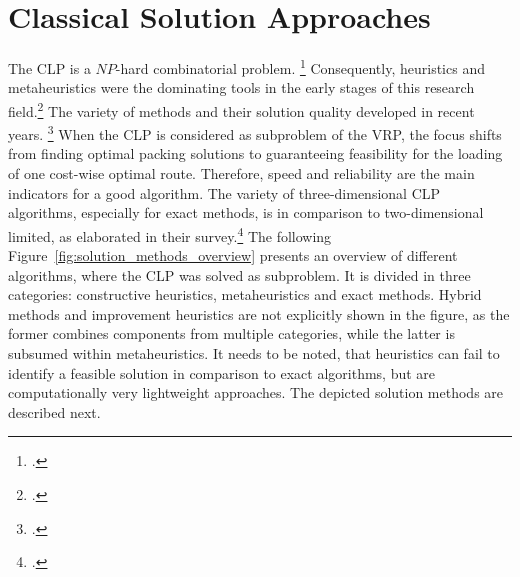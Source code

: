 \section{Classical Solution Approaches}
\label{sec:classical_solution_approaches}
The \gls{CLP} is a $NP$-hard combinatorial problem. \footcite[cf.][p. 11]{bortfeldt_constraints_2013}
Consequently, heuristics and metaheuristics were the dominating tools
in the early stages of this research field.\footcite[cf.][]{pisinger_heuristics_2002} The variety of methods
and their solution quality developed in recent years. \footcite[cf.][p. 23]{iori_exact_2021}
When the \gls{CLP} is considered as subproblem of the \gls{VRP}, the focus shifts from finding optimal
packing solutions to guaranteeing feasibility for the loading of one cost-wise optimal route. Therefore,
speed and reliability are the main indicators for a good algorithm.
The variety of three-dimensional \gls{CLP} algorithms, especially for exact methods, is in comparison to two-dimensional limited, as
\textcite{zhao_comparative_2016} elaborated in their survey.\footcite[cf.][]{zhao_comparative_2016}
The following Figure~\ref{fig:solution_methods_overview} presents an overview of different algorithms,
where the \gls{CLP} was solved as subproblem.
It is divided in three categories: constructive heuristics, metaheuristics
and exact methods. Hybrid methods and improvement heuristics are not explicitly shown in the figure,
as the former combines components from multiple categories, while the latter is subsumed within
metaheuristics. It needs to be noted, that heuristics can fail to identify a feasible solution
in comparison to exact algorithms, but are computationally very lightweight approaches.
The depicted solution methods are described next.



